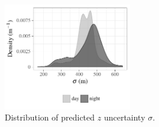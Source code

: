 \documentclass[essd,manuscript]{copernicus}\usepackage[]{graphicx}\usepackage[]{color}
\newenvironment{knitrout}{}{} %
\newcommand\CBH{\ensuremath{z}}
\begin{document}

\begin{figure}
  \centering
\begin{knitrout}
\color{fgcolor}

{\centering \includegraphics[width=0.5\textwidth]{figure/method-cbase-rmse-1} 

}



\end{knitrout}
  \caption{Distribution of predicted \CBH{} uncertainty $\sigma$.}
  \label{fig:uncertainty}
\end{figure}

\end{document}
